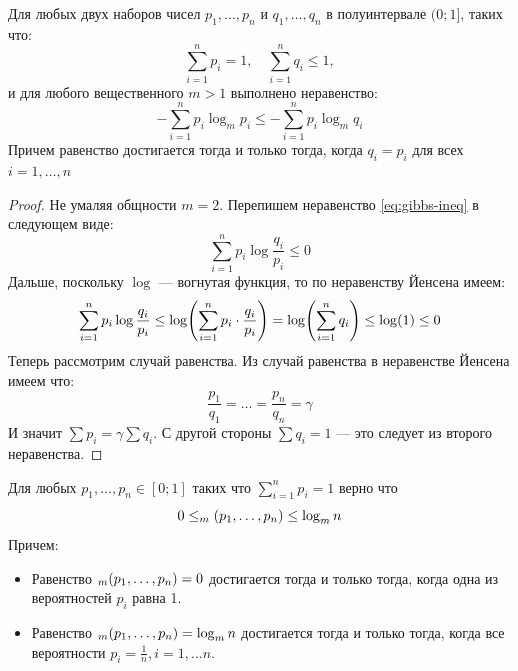 \begin{Lemma}
    \label{lm:gibbs-ineq}
    Для любых двух наборов чисел $p_1, \ldots, p_n$ и $q_1, \ldots, q_n$ в полуинтервале $(0; 1]$, таких что:
	\[
        \sum_{i = 1}^{n} p_i = 1, \quad
        \sum_{i = 1}^{n} q_i \leq 1,
	\]
    и для любого вещественного $m > 1$ выполнено неравенство:
    \begin{equation}
        \label{eq:gibbs-ineq}
       -\sum_{i = 1}^{n} p_i \log_m p_i  \leq  -\sum_{i = 1}^{n} p_i \log_m q_i
    \end{equation}
    Причем равенство достигается тогда и только тогда, когда $q_i = p_i$ для всех $i = 1,\ldots, n$
\end{Lemma}
\begin{proof}
    Не умаляя общности $m = 2$. Перепишем неравенство \eqref{eq:gibbs-ineq} в следующем виде:
    \[
        \sum_{i = 1}^{n} p_i \log \frac{q_i}{p_i} \leq 0
    \]
    Дальше, поскольку $\log$ --- вогнутая функция, то по неравенству Йенсена имеем:
    \[
        \sum_{i = 1}^{n} p_i \log \frac{q_i}{p_i} \leq \log\mleft(\sum_{i = 1}^{n} p_i \cdot \frac{q_i}{p_i}\mright) = \log\mleft(\sum_{i = 1}^{n}q_i\mright) \leq \log(1) \leq 0
    \]
	Теперь рассмотрим случай равенства. Из случай равенства в неравенстве Йенсена имеем что:
	\[
		\frac{p_1}{q_1} = \ldots = \frac{p_n}{q_n} = \gamma
	\]
	И значит $\sum p_i = \gamma \sum q_i$. С другой стороны $\sum q_i = 1$ --- это следует из второго неравенства.
\end{proof}
\begin{theorem}
    Для любых \(p_1, \ldots, p_n \in [0; 1]\) таких что \(\sum_{i = 1}^{n} p_i = 1\) верно что
    \[
        0 \leq \relax_m(p_1, \ldots, p_n) \leq \log_m n
    \]
	Причем:
	\begin{itemize}[compact]
		\item Равенство $\relax_m(p_1, \ldots, p_n) = 0$ достигается тогда и только тогда, когда  одна из вероятностей $p_i$ равна 1.
		\item Равенство $\relax_m(p_1, \ldots, p_n) = \log_m n$ достигается тогда и только тогда, когда все вероятности $p_i = \frac{1}{n}, i = 1,\ldots n$.
	\end{itemize}
\end{theorem}
